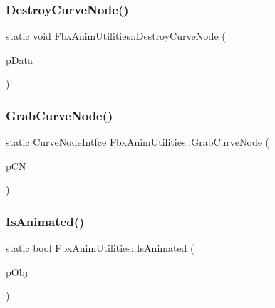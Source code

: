 \mbox{\label{class_fbx_anim_utilities_a0dc57168a97e78aa496f50564b3861ff}} 
\subsubsection{\texorpdfstring{Destroy\+Curve\+Node()}{DestroyCurveNode()}}
{\footnotesize\ttfamily static void Fbx\+Anim\+Utilities\+::\+Destroy\+Curve\+Node (\begin{DoxyParamCaption}\item[{\hyperlink{class_fbx_anim_utilities_1_1_curve_node_intfce}{Curve\+Node\+Intfce} \&}]{p\+Data }\end{DoxyParamCaption})\hspace{0.3cm}{\ttfamily [static]}}

\mbox{\label{class_fbx_anim_utilities_ae558341ccc5b80be1cfbf26d14afae03}} 
\subsubsection{\texorpdfstring{Grab\+Curve\+Node()}{GrabCurveNode()}}
{\footnotesize\ttfamily static \hyperlink{class_fbx_anim_utilities_1_1_curve_node_intfce}{Curve\+Node\+Intfce} Fbx\+Anim\+Utilities\+::\+Grab\+Curve\+Node (\begin{DoxyParamCaption}\item[{\hyperlink{class_fbx_anim_curve_node}{Fbx\+Anim\+Curve\+Node} $\ast$}]{p\+CN }\end{DoxyParamCaption})\hspace{0.3cm}{\ttfamily [static]}}

\mbox{\label{class_fbx_anim_utilities_aded021028322b991d38cb1683455a1c2}} 
\subsubsection{\texorpdfstring{Is\+Animated()}{IsAnimated()}}
{\footnotesize\ttfamily static bool Fbx\+Anim\+Utilities\+::\+Is\+Animated (\begin{DoxyParamCaption}\item[{\hyperlink{class_fbx_object}{Fbx\+Object} $\ast$}]{p\+Obj }\end{DoxyParamCaption})\hspace{0.3cm}{\ttfamily [static]}}

